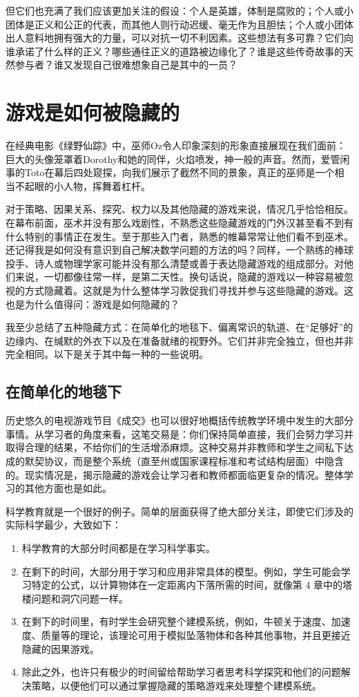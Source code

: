 但它们也充满了我们应该更加关注的假设：个人是英雄，体制是腐败的；个人或小团体是正义和公正的代表，而其他人则行动迟缓、毫无作为且胆怯；个人或小团体出人意料地拥有强大的力量，可以对抗一切不利因素。这些想法有多可靠？它们向谁承诺了什么样的正义？哪些通往正义的道路被边缘化了？谁是这些传奇故事的天然参与者？谁又发现自己很难想象自己是其中的一员？

\section*{游戏是如何被隐藏的}

在经典电影《绿野仙踪》中，巫师Oz令人印象深刻的形象直接展现在我们面前：巨大的头像笼罩着Dorothy和她的同伴，火焰喷发，神一般的声音。然而，爱管闲事的Toto在幕后四处窥探，向我们展示了截然不同的景象，真正的巫师是一个相当不起眼的小人物，挥舞着杠杆。

对于策略、因果关系、探究、权力以及其他隐藏的游戏来说，情况几乎恰恰相反。在幕布前面，巫术并没有那么戏剧性，不熟悉这些隐藏游戏的门外汉甚至看不到有什么特别的事情正在发生。至于那些入门者，熟悉的帷幕常常让他们看不到巫术。还记得我是如何没有意识到自己解决数学问题的方法的吗？同样，一个熟练的棒球投手、诗人或物理学家可能并没有那么清楚或善于表达隐藏游戏的组成部分。对他们来说，一切都像往常一样，是第二天性。换句话说，隐藏的游戏以一种容易被忽视的方式隐藏着。这就是为什么整体学习敦促我们寻找并参与这些隐藏的游戏。这也是为什么值得问：游戏是如何隐藏的？

我至少总结了五种隐藏方式：在简单化的地毯下、偏离常识的轨道、在“足够好”的边缘内、在缄默的外衣下以及在准备就绪的视野外。它们并非完全独立，但也并非完全相同。以下是关于其中每一种的一些说明。

\subsection*{在简单化的地毯下}

历史悠久的电视游戏节目《成交》也可以很好地概括传统教学环境中发生的大部分事情。从学习者的角度来看，这笔交易是：你们保持简单直接，我们会努力学习并取得合理的结果，不给你们的生活增添麻烦。这种交易并非教师和学生之间私下达成的默契协议，而是整个系统（直至州或国家课程标准和考试结构层面）中隐含的。现实情况是，揭示隐藏的游戏会让学习者和教师都面临更复杂的情况。整体学习的其他方面也是如此。

科学教育就是一个很好的例子。简单的层面获得了绝大部分关注，即使它们涉及的实际科学最少，大致如下：
\begin{enumerate}
    \item 科学教育的大部分时间都是在学习科学事实。
    \item 在剩下的时间，大部分用于学习和应用非常具体的模型。例如，学生可能会学习特定的公式，以计算物体在一定距离内下落所需的时间，就像第 4 章中的塔楼问题和洞穴问题一样。
    \item 在剩下的时间里，有时学生会研究整个建模系统，例如，牛顿关于速度、加速度、质量等的理论，该理论可用于模拟坠落物体和各种其他事物，并且更接近隐藏的因果游戏。
    \item 除此之外，也许只有极少的时间留给帮助学习者思考科学探究和他们的问题解决策略，以便他们可以通过掌握隐藏的策略游戏来处理整个建模系统。
\end{enumerate}

